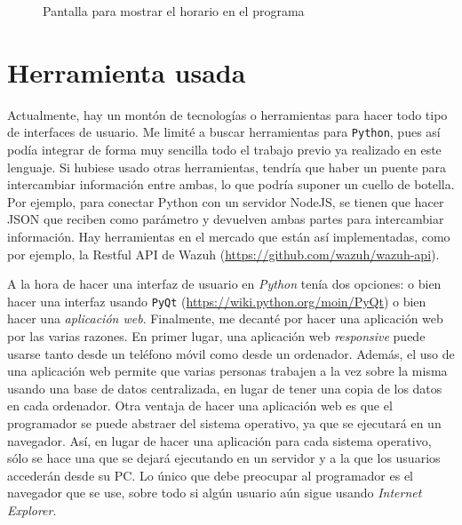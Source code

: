 \begin{figure}
\centering
\scalebox{.6}{}
\caption{Pantalla para mostrar el horario en el programa}
\label{horario}
\end{figure}

\section{Herramienta usada}
Actualmente, hay un montón de tecnologías o herramientas para hacer todo tipo de interfaces de usuario. Me limité a buscar herramientas para \texttt{Python}, pues así podía integrar de forma muy sencilla todo el trabajo previo ya realizado en este lenguaje. Si hubiese usado otras herramientas, tendría que haber un puente para intercambiar información entre ambas, lo que podría suponer un cuello de botella. Por ejemplo, para conectar Python con un servidor NodeJS, se tienen que hacer JSON que reciben como parámetro y devuelven ambas partes para intercambiar información. Hay herramientas en el mercado que están así implementadas, como por ejemplo, la Restful API de Wazuh (\url{https://github.com/wazuh/wazuh-api}). 

A la hora de hacer una interfaz de usuario en \textit{Python} tenía dos opciones: o bien hacer una interfaz usando \texttt{PyQt} (\url{https://wiki.python.org/moin/PyQt}) o bien hacer una \textit{aplicación web}. Finalmente, me decanté por hacer una aplicación web por las varias razones. En primer lugar, una aplicación web \textit{responsive} puede usarse tanto desde un teléfono móvil como desde un ordenador. Además, el uso de una aplicación web permite que varias personas trabajen a la vez sobre la misma usando una base de datos centralizada, en lugar de tener una copia de los datos en cada ordenador. Otra ventaja de hacer una aplicación web es que el programador se puede abstraer del sistema operativo, ya que se ejecutará en un navegador. Así, en lugar de hacer una aplicación para cada sistema operativo, sólo se hace una que se dejará ejecutando en un servidor y a la que los usuarios accederán desde su PC. Lo único que debe preocupar al programador es el navegador que se use, sobre todo si algún usuario aún sigue usando \textit{Internet Explorer}.

